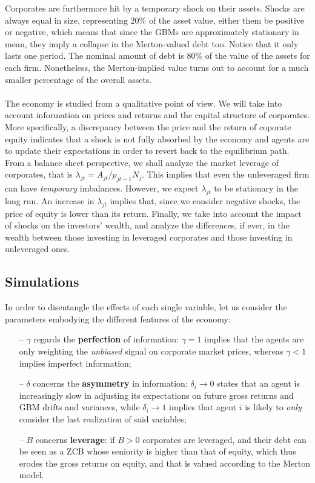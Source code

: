 \documentclass[11pt]{article}
\begin{document}
Corporates are furthermore hit by a temporary shock on their assets. Shocks are always equal in size, representing $20\%$ of the asset value, either them be positive or negative, which means that since the GBMs are approximately stationary in mean, they imply a collapse in the Merton-valued debt too. Notice that it only lasts one period. The nominal amount of debt is $80\%$ of the value of the assets for each firm. Nonetheless, the Merton-implied value turns out to account for a much smaller percentage of the overall assets.\\\\
The economy is studied from a qualitative point of view. We will take into account information on prices and returns and the capital structure of corporates. More specifically, a discrepancy between the price and the return of coporate equity indicates that a shock is not fully absorbed by the economy and agents are to update their expectations in order to revert back to the equilibrium path. From a balance sheet perspective, we shall analyze the market leverage of corporates, that is $\lambda_{jt}=A_{jt}/p_{jt-1}N_j$. This implies that even the unleveraged firm can have \emph{temporary} imbalances. However, we expect $\lambda_{jt}$ to be stationary in the long run. An increase in $\lambda_{jt}$ implies that, since we consider negative shocks, the price of equity is lower than its return. Finally, we take into account the impact of shocks on the investors' wealth, and analyze the differences, if ever, in the wealth between those investing in leveraged corporates and those investing in unleveraged ones.
\subsection{Simulations}
In order to disentangle the effects of each single variable, let us consider the parameters embodying the different features of the economy:
\begin{itemize}
	\item[--] $\gamma$ regards the \textbf{perfection} of information: $\gamma=1$ implies that the agents are only weighting the \emph{unbiased} signal on corporate market prices, whereas $\gamma < 1$ implies imperfect information;
	\item[--] $\delta$ concerns the \textbf{asymmetry} in information: $\delta_i \to 0$ states that an agent is increasingly slow in adjusting its expectations on future gross returns and GBM drifts and variances, while $\delta_i \to 1$ implies that agent $i$ is likely to \emph{only} consider the last realization of said variables;
	\item[--] $B$ concerns \textbf{leverage}: if $B>0$ corporates are leveraged, and their debt can be seen as a ZCB whose seniority is higher than that of equity, which thus erodes the gross returns on equity, and that is valued according to the Merton model.
\end{itemize}
\end{document}
